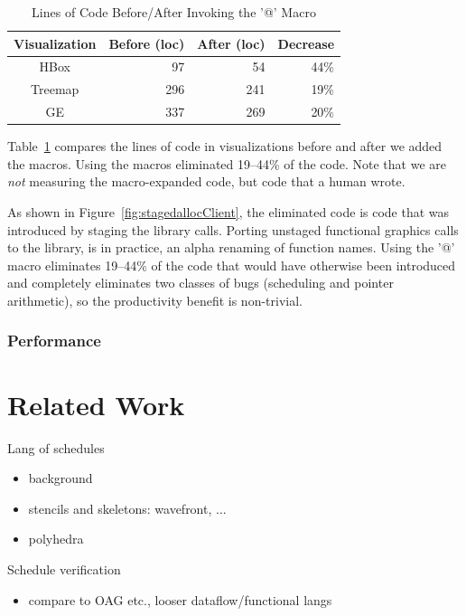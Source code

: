 \begin{table}[ht]
\caption{Lines of Code Before/After Invoking the '@' Macro}
\centering
\begin{tabular}{c r r r}
\hline\hline
 \textbf{Visualization} & \textbf{Before (loc)} & \textbf{After (loc)} & \textbf{Decrease} \\ [0.5ex] \hline
  HBox & 97 & 54 & 44\% \\
  Treemap & 296 & 241 & 19\% \\
  GE & 337 & 269 & 20\% \\ [1ex] 
\hline
\end{tabular}
\label{table:macroreduction}
\end{table}
Table~\ref{table:macroreduction} compares the lines of code in visualizations before and after we added the macros. Using the macros eliminated 19--44\% of the code. Note that we are \emph{not} measuring the macro-expanded code, but code that a human wrote.



As shown in Figure~\ref{fig:stagedallocClient}, the eliminated code is code that was introduced by staging the library calls. Porting unstaged functional graphics calls to the library, is in practice, an alpha renaming of function names.  Using the '@' macro eliminates 19--44\% of the code that would have otherwise been introduced and completely eliminates two classes of bugs (scheduling and pointer arithmetic), so the productivity benefit is non-trivial. 

\subsubsection{Performance}


\section{Related Work}
Lang of schedules
\begin{itemize}
\item background
\item stencils and skeletons: wavefront, ...
\item polyhedra
\end{itemize}
Schedule verification
\begin{itemize}
\item compare to OAG etc., looser dataflow/functional langs
\end{itemize}